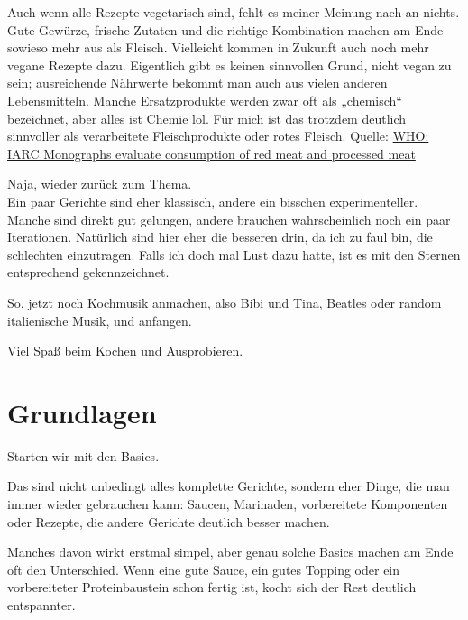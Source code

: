 \documentclass[
  a4paper,
  twoside,
  11pt
]{article}
\begin{document}
Auch wenn alle Rezepte vegetarisch sind, fehlt es meiner Meinung nach an nichts. Gute Gewürze, frische Zutaten und die richtige Kombination machen am Ende sowieso mehr aus als Fleisch. Vielleicht kommen in Zukunft auch noch mehr vegane Rezepte dazu. Eigentlich gibt es keinen sinnvollen Grund, nicht vegan zu sein; ausreichende Nährwerte bekommt man auch aus vielen anderen Lebensmitteln. Manche Ersatzprodukte werden zwar oft als „chemisch“ bezeichnet, aber alles ist Chemie lol. Für mich ist das trotzdem deutlich sinnvoller als verarbeitete Fleischprodukte oder rotes Fleisch. Quelle:
\href{https://www.iarc.who.int/wp-content/uploads/2018/07/pr240_E.pdf}{WHO: IARC Monographs evaluate consumption of red meat and processed meat}

Naja, wieder zurück zum Thema.\\
Ein paar Gerichte sind eher klassisch, andere ein bisschen experimenteller. Manche sind direkt gut gelungen, andere brauchen wahrscheinlich noch ein paar Iterationen. Natürlich sind hier eher die besseren drin, da ich zu faul bin, die schlechten einzutragen. Falls ich doch mal Lust dazu hatte, ist es mit den Sternen entsprechend gekennzeichnet.

So, jetzt noch Kochmusik anmachen, also Bibi und Tina, Beatles oder random italienische Musik, und anfangen.

Viel Spaß beim Kochen und Ausprobieren.

\newpage
%



\section{Grundlagen}

Starten wir mit den Basics.

Das sind nicht unbedingt alles komplette Gerichte, sondern eher Dinge, die man immer wieder gebrauchen kann: Saucen, Marinaden, vorbereitete Komponenten oder Rezepte, die andere Gerichte deutlich besser machen.

Manches davon wirkt erstmal simpel, aber genau solche Basics machen am Ende oft den Unterschied. Wenn eine gute Sauce, ein gutes Topping oder ein vorbereiteter Proteinbaustein schon fertig ist, kocht sich der Rest deutlich entspannter.

\mylocaltableofcontents%
\newpage
\end{document}
